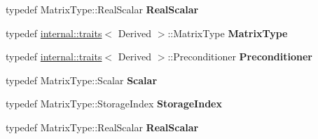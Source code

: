 \begin{DoxyCompactItemize}
typedef Matrix\+Type\+::\+Real\+Scalar {\bfseries Real\+Scalar}
\item 
\mbox{\label{group___iterative_linear_solvers___module_a1df877cce514c709a0333592c25d4465}} 
typedef \hyperlink{struct_eigen_1_1internal_1_1traits}{internal\+::traits}$<$ Derived $>$\+::Matrix\+Type {\bfseries Matrix\+Type}
\item 
\mbox{\label{group___iterative_linear_solvers___module_a72269c01d2c2a7309ef64724add2bd57}} 
typedef \hyperlink{struct_eigen_1_1internal_1_1traits}{internal\+::traits}$<$ Derived $>$\+::Preconditioner {\bfseries Preconditioner}
\item 
\mbox{\label{group___iterative_linear_solvers___module_a6394965cb238cfd9dcde422a7d483d49}} 
typedef Matrix\+Type\+::\+Scalar {\bfseries Scalar}
\item 
\mbox{\label{group___iterative_linear_solvers___module_a9c6e7fa7de26b1608d35c75a5eb6370c}} 
typedef Matrix\+Type\+::\+Storage\+Index {\bfseries Storage\+Index}
\item 
\mbox{\label{group___iterative_linear_solvers___module_a4d87eef9d6728d2e366c20fd9adf2140}} 
typedef Matrix\+Type\+::\+Real\+Scalar {\bfseries Real\+Scalar}
\end{DoxyCompactItemize}
